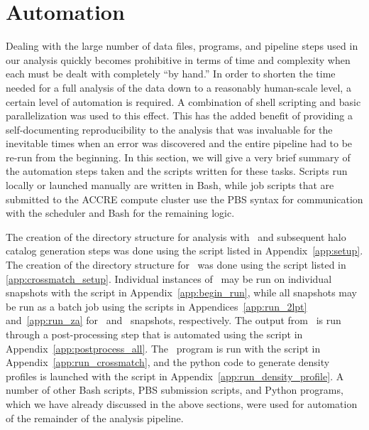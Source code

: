 
%
%

\section{Automation}
\label{sec:automation}



Dealing with the large number of data files, programs, and pipeline steps used in our analysis quickly becomes prohibitive in terms of time and complexity when each must be dealt with completely ``by hand.''  In order to shorten the time needed for a full analysis of the data down to a reasonably human-scale level, a certain level of automation is required.  A combination of shell scripting and basic parallelization was used to this effect.  This has the added benefit of providing a self-documenting reproducibility to the analysis that was invaluable for the inevitable times when an error was discovered and the entire pipeline had to be re-run from the beginning.  In this section, we will give a very brief summary of the automation steps taken and the scripts written for these tasks.  Scripts run locally or launched manually are written in Bash, while job scripts that are submitted to the ACCRE compute cluster use the PBS syntax for communication with the scheduler and Bash for the remaining logic.

The creation of the directory structure for analysis with \rockstar\ and subsequent halo catalog generation steps was done using the script listed in Appendix~\ref{app:setup}.  The creation of the directory structure for \crossmatch\ was done using the script listed in \ref{app:crossmatch_setup}.  Individual instances of \rockstar\ may be run on individual snapshots with the script in Appendix~\ref{app:begin_run}, while all snapshots may be run as a batch job using the scripts in Appendices~\ref{app:run_2lpt} and~\ref{app:run_za} for \lpt\ and \za\ snapshots, respectively.  The output from \rockstar\ is run through a post-processing step that is automated using the script in Appendix~\ref{app:postprocess_all}.  The \crossmatch\ program is run with the script in Appendix~\ref{app:run_crossmatch}, and the python code to generate density profiles is launched with the script in Appendix~\ref{app:run_density_profile}.  A number of other Bash scripts, PBS submission scripts, and Python programs, which we have already discussed in the above sections, were used for automation of the remainder of the analysis pipeline.




